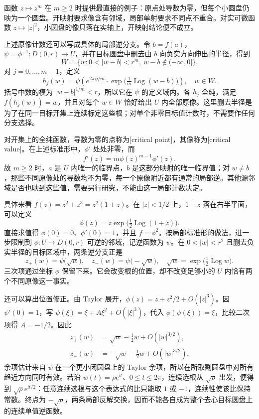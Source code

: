 函数 \(z\mapsto z^m\) 在 \(m\ge2\) 时提供最直接的例子：原点处导数为零，但每个小圆盘仍映为一个圆盘。开映射要求像含有邻域，局部单射要求不同点不重合。对实可微函数 \(z\mapsto|z|^2\)，小圆盘的像只落在实轴上，开映射结论便不成立。

\ProseParagraphBreak

上述原像计数还可以写成具体的局部逆分支。令 \(b=f(a)\)，\(\psi=\phi^{-1}:D(0,r)\to U\)，并在目标圆盘中删去由 \(b\) 向负实方向伸出的半径，得到
\[
 W=\{w:0<|w-b|<r^m,\ w-b\notin(-\infty,0]\}.
\]
对 \(j=0,\ldots,m-1\)，定义
\[
 h_j(w)=\psi\left(e^{2\pi\mathrm{i}j/m}\cdot
          \exp\bigl(\tfrac1m\operatorname{Log}(w-b)\bigr)\right),
 \quad w\in W.
\]
括号中数的模为 \(|w-b|^{1/m}<r\)，所以它在 \(\psi\) 的定义域内。各 \(h_j\) 全纯，满足 \(f(h_j(w))=w\)，并且对每个 \(w\in W\) 恰好给出 \(U\) 内全部原像。这里删去半径是为了在同一目标开集上连续标定这些根；对单个非零目标值计数时，不需要作任何分支选择。

\ProseParagraphBreak

对开集上的全纯函数，导数为零的点称为[critical point]，其像称为[critical value]。在上述标准形中，\(\phi'\) 处处非零，而
\[
 f'(z)=m\phi(z)^{m-1}\phi'(z).
\]
故 \(m\ge2\) 时，\(a\) 是 \(U\) 内唯一的临界点，\(b\) 是这部分映射的唯一临界值；对 \(w\ne b\)，那些不同原像处的导数均不为零，每一个原像附近都有通常的局部逆。其他源邻域是否也映到这些值，需要另行研究，不能由这一局部计数决定。

\ProseParagraphBreak

具体来看 \(f(z)=z^2+z^3=z^2(1+z)\)。在 \(|z|<1/2\) 上，\(1+z\) 落在右半平面，可以定义
\[
 \phi(z)=z\exp\bigl(\tfrac12\operatorname{Log}(1+z)\bigr).
\]
直接求值得 \(\phi(0)=0\)、\(\phi'(0)=1\)，并且 \(f=\phi^2\)。按局部标准形的做法，进一步限制到 \(\phi:U\to D(0,r)\) 可逆的邻域，记逆函数为 \(\psi\)。在 \(0<|w|<r^2\) 且删去负实半径的目标区域中，两条逆分支正是
\[
 z_+(w)=\psi\bigl(\sqrt w\bigr),
 \quad z_-(w)=\psi\bigl(-\sqrt w\bigr),
 \quad \sqrt w=\exp\bigl(\tfrac12\operatorname{Log}w\bigr).
\]
三次项通过坐标 \(\phi\) 保留下来。它会改变根的位置，却不改变足够小的 \(U\) 内恰有两个不同原像这一事实。

\ProseParagraphBreak

还可以算出位置修正。由 Taylor 展开，\(\phi(z)=z+z^2/2+O(|z|^3)\)。因 \(\psi'(0)=1\)，写 \(\psi(\xi)=\xi+A\xi^2+O(|\xi|^3)\)，代入 \(\phi(\psi(\xi))=\xi\)，比较二次项得 \(A=-1/2\)。因此
\[
\begin{aligned}
 z_+(w)&=\sqrt w-\tfrac12w+O(|w|^{3/2}),\\
 z_-(w)&=-\sqrt w-\tfrac12w+O(|w|^{3/2}).
\end{aligned}
\]
余项估计来自 \(\psi\) 在一个更小闭圆盘上的 Taylor 余项，所以在所取割圆盘中对所有趋近方向同时有效。若沿 \(w(t)=\rho e^{\mathrm{i}t}\)、\(0\le t\le2\pi\)，连续选根从 \(\sqrt\rho\) 出发，便得到 \(\sqrt\rho e^{\mathrm{i}t/2}\)：任意连续选根与这个表达式的比只能取 \(1\) 或 \(-1\)，连续性使该比保持常数。终点为 \(-\sqrt\rho\)，两条局部反解交换，因而不能各自成为整个去心目标圆盘上的连续单值逆函数。

